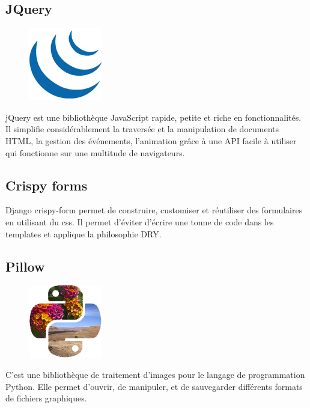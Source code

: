 \subsection{JQuery}
    \begin{figure}
        \vspace{-22pt}
        \begin{center}
            \includegraphics[scale=0.36]{images/logo/jquery.png}
            \label{fig79}
        \end{center}
        \vspace{-20pt}
        \vspace{-10pt}
    \end{figure}

jQuery est une bibliothèque JavaScript rapide, petite et riche en 
fonctionnalités. Il simplifie considérablement la traversée et la manipulation 
de documents HTML, la gestion des événements, l'animation grâce à une API facile 
à utiliser qui fonctionne sur une multitude de navigateurs\cite{23}.
        
\subsection{Crispy forms}
Django crispy-form permet de construire, customiser et réutiliser des 
formulaires en utilisant du css. Il permet d'éviter d'écrire une tonne de code 
dans les templates et applique la philosophie DRY\cite{24}.
    
\subsection{Pillow}
    \begin{figure}
        \vspace{-22pt}
        \begin{center}
            \includegraphics[scale=0.36]{images/logo/pillow.png}
            \label{fig80}
        \end{center}
        \vspace{-20pt}
        \vspace{-10pt}
    \end{figure}
C’est une bibliothèque de traitement d'images pour le langage de programmation
Python. Elle permet d'ouvrir, de manipuler, et de sauvegarder différents formats 
de fichiers graphiques\cite{25}.
    

